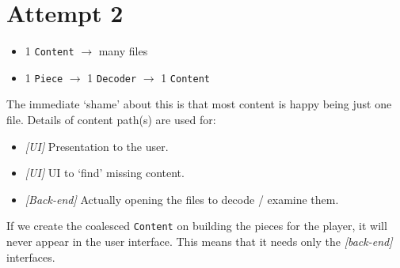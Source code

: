 \documentclass{article}
\begin{document}
\section{Attempt 2}

\begin{itemize}
\item 1 \texttt{Content} $\to$ many files
\item 1 \texttt{Piece} $\to$ 1 \texttt{Decoder} $\to$ 1 \texttt{Content}
\end{itemize}

The immediate `shame' about this is that most content is happy being
just one file.  Details of content path(s) are used for:

\begin{itemize}
\item \emph{[UI]} Presentation to the user.
\item \emph{[UI]} UI to `find' missing content.
\item \emph{[Back-end]} Actually opening the files to decode / examine them.
\end{itemize}

If we create the coalesced \texttt{Content} on building the pieces for
the player, it will never appear in the user interface.  This means
that it needs only the \emph{[back-end]} interfaces.
\end{document}
